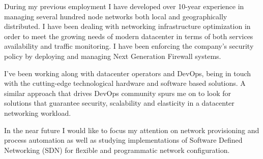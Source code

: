 

\vspace{-1.3em} %

\begin{cvparagraph}
\vspace{5mm}
\begin{multicols}{2}  %
During my previous employment I have developed over 10-year experience in managing several hundred node networks both local and geographically distributed. I have been dealing with networking infrastructure optimization in order to meet the growing needs of modern datacenter in terms of both services availability and traffic monitoring. I have been enforcing the company's security policy by deploying and managing Next Generation Firewall systems.

I've been working along with datacenter operators and DevOps, being in touch with the cutting-edge technological hardware and software based solutions. A similar approach that drives DevOps community spurs me on to look for solutions that guarantee security, scalability and elasticity in a datacenter networking workload.

In the near future I would like to focus my attention on network provisioning and process automation as well as studying implementations of Software Defined Networking (SDN) for flexible and programmatic network configuration.
\end{multicols}
\end{cvparagraph}

